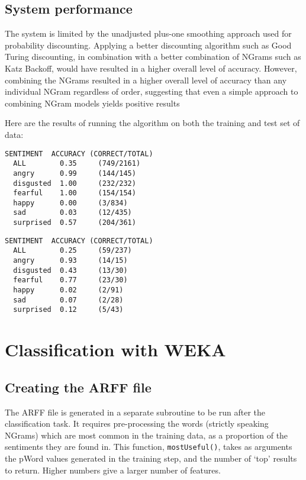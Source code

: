 \documentclass[a4paper,oneside]{article}
\begin{document}
\subsection{System performance}

The system is limited by the unadjusted plus-one smoothing approach used for
probability discounting. Applying a better discounting algorithm such as Good
Turing discounting, in combination with a better combination of NGrams such as
Katz Backoff, would have resulted in a higher overall level of accuracy.
However, combining the NGrams resulted in a higher overall level of accuracy
than any individual NGram regardless of order, suggesting that even a simple
approach to combining NGram models yields positive results

Here are the results of running the algorithm on both the training and test set
of data:

\begin{lstlisting}[caption=Training Set]
  SENTIMENT  ACCURACY (CORRECT/TOTAL)
  ALL        0.35     (749/2161)
  angry      0.99     (144/145)
  disgusted  1.00     (232/232)
  fearful    1.00     (154/154)
  happy      0.00     (3/834)
  sad        0.03     (12/435)
  surprised  0.57     (204/361)
\end{lstlisting}

\begin{lstlisting}[caption=Test Set]
  SENTIMENT  ACCURACY (CORRECT/TOTAL)
  ALL        0.25     (59/237)
  angry      0.93     (14/15)
  disgusted  0.43     (13/30)
  fearful    0.77     (23/30)
  happy      0.02     (2/91)
  sad        0.07     (2/28)
  surprised  0.12     (5/43)
\end{lstlisting}

\section{Classification with WEKA}

\subsection{Creating the ARFF file}

The ARFF file is generated in a separate subroutine to be run after the
classification task.  It requires pre-processing the words (strictly speaking
NGrams) which are most common in the training data, as a proportion of the
sentiments they are found in. This function, \verb!mostUseful()!, takes as
arguments the pWord values generated in the training step, and the number of
`top' results to return. Higher numbers give a larger number of features.
\end{document}

